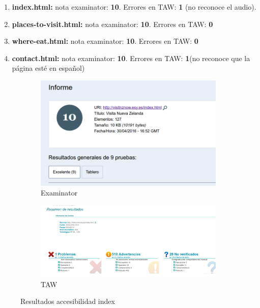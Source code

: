 \begin{enumerate}
	\item \textbf{index.html: }nota examinator: \textbf{10}. Errores en TAW: \textbf{1} (no reconoce el audio).	
	\item \textbf{places-to-visit.html: }nota examinator: \textbf{10}. Errores en TAW: \textbf{0} 
	\item \textbf{where-eat.html: }nota examinator: \textbf{10}. Errores en TAW: \textbf{0}
	\item \textbf{contact.html: }nota examinator: \textbf{10}. Errores en TAW: \textbf{1}(no reconoce que la página esté en español)

\end{enumerate}
	\begin{figure}
		\centering
		\begin{subfigure}{.5\textwidth}
			\centering
			\includegraphics[width=.8\linewidth]{./Fotos/exa-index.png}
			\caption{Examinator}
			\label{fig: Examinator index}
		\end{subfigure}%
		\begin{subfigure}{.5\textwidth}
			\centering
			\includegraphics[width=.8\linewidth]{./Fotos/taw-index.png}
			\caption{TAW}
			\label{fig: TAW index}
		\end{subfigure}
		\caption{Resultados accesibilidad index}
		\label{fig: Resultados accesibilidad index}
	\end{figure}
